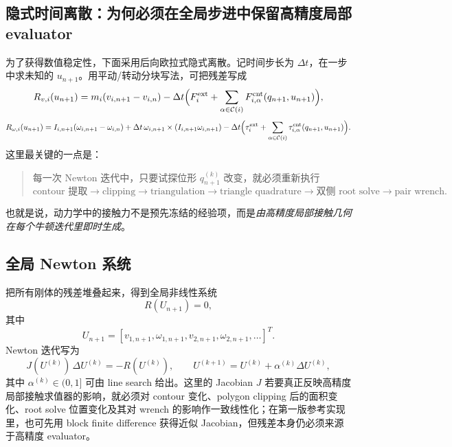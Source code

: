 \documentclass[12pt,a4paper]{ctexart}
\begin{document}
\subsection{隐式时间离散：为何必须在全局步进中保留高精度局部 evaluator}

为了获得数值稳定性，下面采用后向欧拉式隐式离散。记时间步长为 $\Delta t$，在一步中求未知的 $u_{n+1}$。用平动/转动分块写法，可把残差写成
\begin{equation}
    R_{v,i}(u_{n+1}) = m_i (v_{i,n+1}-v_{i,n}) - \Delta t\Bigl(F_i^{\mathrm{ext}} + \sum_{\alpha\in\mathcal C(i)} F_{i,\alpha}^{\mathrm{cnt}}(q_{n+1},u_{n+1})\Bigr),
\end{equation}
\begin{equation}
    R_{\omega,i}(u_{n+1}) = I_{i,n+1}(\omega_{i,n+1}-\omega_{i,n}) + \Delta t\,\omega_{i,n+1}\times(I_{i,n+1}\omega_{i,n+1})
    - \Delta t\Bigl(\tau_i^{\mathrm{ext}} + \sum_{\alpha\in\mathcal C(i)} \tau_{i,\alpha}^{\mathrm{cnt}}(q_{n+1},u_{n+1})\Bigr).
\end{equation}
这里最关键的一点是：
\begin{quote}
每一次 Newton 迭代中，只要试探位形 $q_{n+1}^{(k)}$ 改变，就必须重新执行
\[\text{contour 提取} \to \text{clipping} \to \text{triangulation} \to \text{triangle quadrature} \to \text{双侧 root solve} \to \text{pair wrench}.\]
\end{quote}
也就是说，动力学中的接触力不是预先冻结的经验项，而是\emph{由高精度局部接触几何在每个牛顿迭代里即时生成}。

\subsection{全局 Newton 系统}

把所有刚体的残差堆叠起来，得到全局非线性系统
\begin{equation}
    R(U_{n+1}) = 0,
\end{equation}
其中
\begin{equation}
    U_{n+1} = [v_{1,n+1},\omega_{1,n+1},v_{2,n+1},\omega_{2,n+1},\dots]^T.
\end{equation}
Newton 迭代写为
\begin{equation}
    J(U^{(k)})\,\Delta U^{(k)} = -R(U^{(k)}),
    \qquad
    U^{(k+1)} = U^{(k)} + \alpha^{(k)}\Delta U^{(k)},
\end{equation}
其中 $\alpha^{(k)}\in(0,1]$ 可由 line search 给出。这里的 Jacobian $J$ 若要真正反映高精度局部接触求值器的影响，就必须对 contour 变化、polygon clipping 后的面积变化、root solve 位置变化及其对 wrench 的影响作一致线性化；在第一版参考实现里，也可先用 block finite difference 获得近似 Jacobian，但残差本身仍必须来源于高精度 evaluator。
\end{document}
